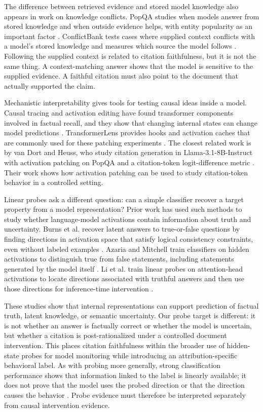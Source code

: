 \documentclass[11pt]{article}
\begin{document}
The difference between retrieved evidence and stored model knowledge also appears in work on knowledge conflicts. PopQA studies when models answer from stored knowledge and when outside evidence helps, with entity popularity as an important factor \cite{mallen2023popqa}. ConflictBank tests cases where supplied context conflicts with a model's stored knowledge and measures which source the model follows \cite{su2024conflictbank}. Following the supplied context is related to citation faithfulness, but it is not the same thing. A context-matching answer shows that the model is sensitive to the supplied evidence. A faithful citation must also point to the document that actually supported the claim.

Mechanistic interpretability gives tools for testing causal ideas inside a model. Causal tracing and activation editing have found transformer components involved in factual recall, and they show that changing internal states can change model predictions \cite{meng2022rome}. TransformerLens provides hooks and activation caches that are commonly used for these patching experiments \cite{nanda2022transformerlens}. The closest related work is by van Dort and Heuss, who study citation generation in Llama-3.1-8B-Instruct with activation patching on PopQA and a citation-token logit-difference metric \cite{vandort2026cite}. Their work shows how activation patching can be used to study citation-token behavior in a controlled setting.

Linear probes ask a different question: can a simple classifier recover a target property from a model representation? Prior work has used such methods to study whether language-model activations contain information about truth and uncertainty. Burns et al. recover latent answers to true-or-false questions by finding directions in activation space that satisfy logical consistency constraints, even without labeled examples \cite{burns2023latent}. Azaria and Mitchell train classifiers on hidden activations to distinguish true from false statements, including statements generated by the model itself \cite{azaria2023lying}. Li et al. train linear probes on attention-head activations to locate directions associated with truthful answers and then use those directions for inference-time intervention \cite{li2023iti}.

These studies show that internal representations can support prediction of factual truth, latent knowledge, or semantic uncertainty. Our probe target is different: it is not whether an answer is factually correct or whether the model is uncertain, but whether a citation is post-rationalized under a controlled document intervention. This places citation faithfulness within the broader use of hidden-state probes for model monitoring while introducing an attribution-specific behavioral label. As with probing more generally, strong classification performance shows that information linked to the label is linearly available; it does not prove that the model uses the probed direction or that the direction causes the behavior \cite{belinkov2022probes}. Probe evidence must therefore be interpreted separately from causal intervention evidence.
\end{document}
